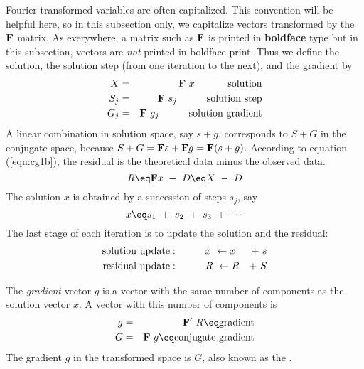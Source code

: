 Fourier-transformed variables are often capitalized.
This convention will be helpful here,
so in this subsection only,
we capitalize vectors transformed by the  $\bold F$  matrix.
As everywhere, a matrix such as $\bold F$
is printed in {\bf boldface} type
but in this subsection,
vectors are {\it not} printed in boldface print.
Thus we define the solution, the solution step
(from one iteration to the next),
and the gradient by
\begin{eqnarray}
X   &=& \bold F \  x\   \quad\quad\quad  {\rm solution}         \\
S_j &=& \bold F \  s_j  \quad\quad\quad  {\rm solution\ step}    \\
G_j &=& \bold F \  g_j  \quad\quad\quad  {\rm solution\ gradient}  
\end{eqnarray}
A linear combination in solution space,
say  $s+g$,  corresponds to  $S+G$  in the conjugate space,
because $S+G = \bold F s + \bold F g = \bold F(s+g)$.
According to equation 
(\ref{eqn:cg1b}),
the residual is the theoretical data minus the observed data.
\begin{equation}
R \eq \bold F  x \ -\ D
  \eq          X \ -\ D
\end{equation}
The solution  $x$  is obtained by a succession of steps  $s_j$, say
\begin{equation}
x \eq s_1 \ +\  s_2 \ +\  s_3 \ +\  \cdots
\end{equation}
The last stage of each iteration is to update the solution and the residual:
\begin{eqnarray}
\label{eqn:xupdate}
{\rm solution\ update:} \quad\quad\quad  & x \ \leftarrow  x&  +\  s\\
\label{eqn:Rupdate}
{\rm residual\ update:} \quad\quad\quad  & R \ \leftarrow  R&  +\  S
\end{eqnarray}

\par
The {\it gradient} vector $g$ is a vector with the same number
of components as the solution vector $x$.
A vector with this number of components is
\begin{eqnarray}
g &=& \bold F' \  R \eq \hbox{gradient}                 \label{eqn:g} \\
G &=& \bold F  \  g \eq \hbox{conjugate gradient}       \label{eqn:G}
\end{eqnarray}
The gradient $g$ in the transformed space is $G$,
also known as the .

